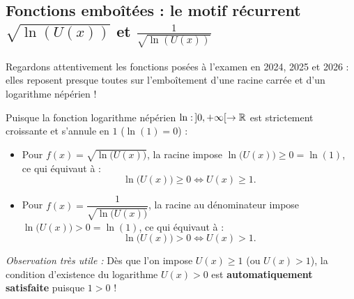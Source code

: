 \subsection{Fonctions emboîtées : le motif récurrent $\sqrt{\ln(U(x))}$ et $\frac{1}{\sqrt{\ln(U(x))}}$}

Regardons attentivement les fonctions posées à l'examen en 2024, 2025 et 2026 : elles reposent presque toutes sur l'emboîtement d'une racine carrée et d'un logarithme népérien !

\begin{theoreme}
Puisque la fonction logarithme népérien $\ln : \,]0, +\infty[ \to \mathbb{R}$ est strictement croissante et s'annule en $1$ ($\ln(1) = 0$) :
\begin{itemize}
    \item Pour $f(x) = \sqrt{\ln\bigl(U(x)\bigr)}$, la racine impose $\ln\bigl(U(x)\bigr) \ge 0 = \ln(1)$, ce qui équivaut à :
    \[
        \boxed{\ln\bigl(U(x)\bigr) \ge 0 \iff U(x) \ge 1}.
    \]
    \item Pour $f(x) = \dfrac{1}{\sqrt{\ln\bigl(U(x)\bigr)}}$, la racine au dénominateur impose $\ln\bigl(U(x)\bigr) > 0 = \ln(1)$, ce qui équivaut à :
    \[
        \boxed{\ln\bigl(U(x)\bigr) > 0 \iff U(x) > 1}.
    \]
\end{itemize}
\emph{Observation très utile :} Dès que l'on impose $U(x) \ge 1$ (ou $U(x) > 1$), la condition d'existence du logarithme $U(x) > 0$ est \textbf{automatiquement satisfaite} puisque $1 > 0$ !
\end{theoreme}

